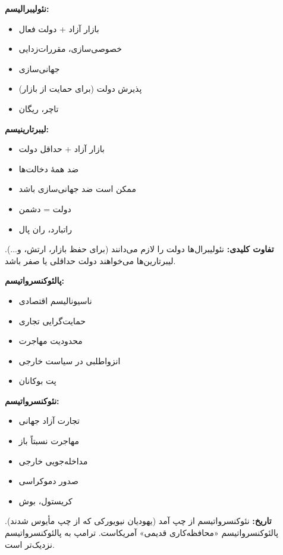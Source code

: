 \begin{tcolorbox}[
    enhanced,
    colback=rightblue!5,
    colframe=rightblue,
    boxrule=1.5pt,
    arc=5pt,
    fonttitle=\bfseries,
    title={\rl{🔵 نئولیبرالیسم در برابر لیبرتارینیسم}}
]

\textbf{نئولیبرالیسم:}
\begin{itemize}
    \item بازار آزاد + دولت فعال
    \item خصوصی‌سازی، مقررات‌زدایی
    \item جهانی‌سازی
    \item پذیرش دولت (برای حمایت از بازار)
    \item تاچر، ریگان
\end{itemize}



\textbf{لیبرتارینیسم:}
\begin{itemize}
    \item بازار آزاد + حداقل دولت
    \item ضد همهٔ دخالت‌ها
    \item ممکن است ضد جهانی‌سازی باشد
    \item دولت = دشمن
    \item راتبارد، ران پال
\end{itemize}


\textbf{تفاوت کلیدی:} نئولیبرال‌ها دولت را لازم می‌دانند (برای حفظ بازار، ارتش، و...). لیبرتارین‌ها می‌خواهند دولت حداقلی یا صفر باشد.
\end{tcolorbox}

\begin{tcolorbox}[
    enhanced,
    colback=rightblue!5,
    colframe=rightblue,
    boxrule=1.5pt,
    arc=5pt,
    fonttitle=\bfseries,
    title={\rl{🔵 پالئوکنسرواتیسم در برابر نئوکنسرواتیسم}}
]

\textbf{پالئوکنسرواتیسم:}
\begin{itemize}
    \item ناسیونالیسم اقتصادی
    \item حمایت‌گرایی تجاری
    \item محدودیت مهاجرت
    \item انزواطلبی در سیاست خارجی
    \item پت بوکانان
\end{itemize}



\textbf{نئوکنسرواتیسم:}
\begin{itemize}
    \item تجارت آزاد جهانی
    \item مهاجرت نسبتاً باز
    \item مداخله‌جویی خارجی
    \item صدور دموکراسی
    \item کریستول، بوش
\end{itemize}


\textbf{تاریخ:} نئوکنسرواتیسم از چپ آمد (یهودیان نیویورکی که از چپ مأیوس شدند). پالئوکنسرواتیسم «محافظه‌کاری قدیمی» آمریکاست. ترامپ به پالئوکنسرواتیسم نزدیک‌تر است.
\end{tcolorbox}

